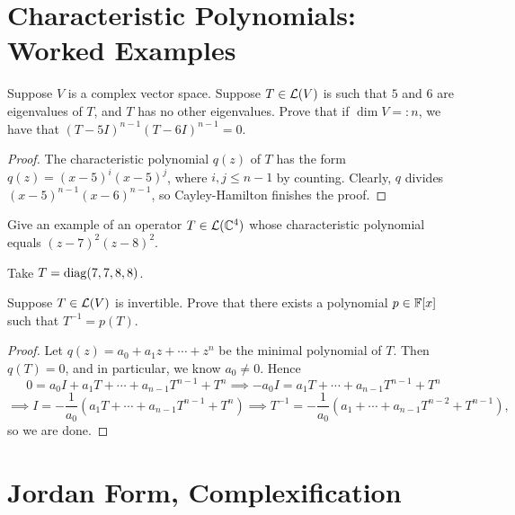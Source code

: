 \documentclass{article}
\begin{document}
\section{Characteristic Polynomials: Worked Examples}
\begin{example}[8C.2]
Suppose $V$ is a complex vector space. Suppose $T\in\mathcal L(V)$ is such that $5$ and $6$ are eigenvalues of $T$, and $T$ has no other eigenvalues. Prove that if $\dim V =: n$, we have that $(T-5I)^{n-1}(T-6I)^{n-1}=0$.
\end{example}
\begin{proof}
The characteristic polynomial $q(z)$ of $T$ has the form $q(z) = (x-5)^i(x-5)^j$, where $i,j\leq n-1$ by counting. Clearly, $q$ divides $(x-5)^{n-1}(x-6)^{n-1}$, so Cayley-Hamilton finishes the proof.
\end{proof}
\begin{example}[8C.3]
Give an example of an operator $T\in\mathcal L(\mathbb C^4)$ whose characteristic polynomial equals $(z-7)^2(z-8)^2$.
\end{example}
\begin{solution}
Take $T = \operatorname{diag}(7, 7, 8, 8)$.
\end{solution}
\begin{example}
Suppose $T\in\mathcal L(V)$ is invertible. Prove that there exists a polynomial $p\in\mathbb F[x]$ such that $T^{-1} = p(T)$.
\end{example}
\begin{proof}
Let $q(z) = a_0 + a_1z + \cdots + z^n$ be the minimal polynomial of $T$. Then $q(T) = 0$, and in particular, we know $a_0 \neq 0$. Hence
$$0 = a_0I + a_1T + \cdots + a_{n-1}T^{n-1} + T^n\implies -a_0I = a_1T + \cdots + a_{n-1}T^{n-1} + T^n$$
$$\implies I =  -\frac 1{a_0}(a_1T + \cdots + a_{n-1}T^{n-1} + T^n)\implies T^{-1} = -\frac 1{a_0}(a_1 + \cdots + a_{n-1}T^{n-2} + T^{n-1}),$$
so we are done.
\end{proof}
\section{Jordan Form, Complexification}
\end{document}
